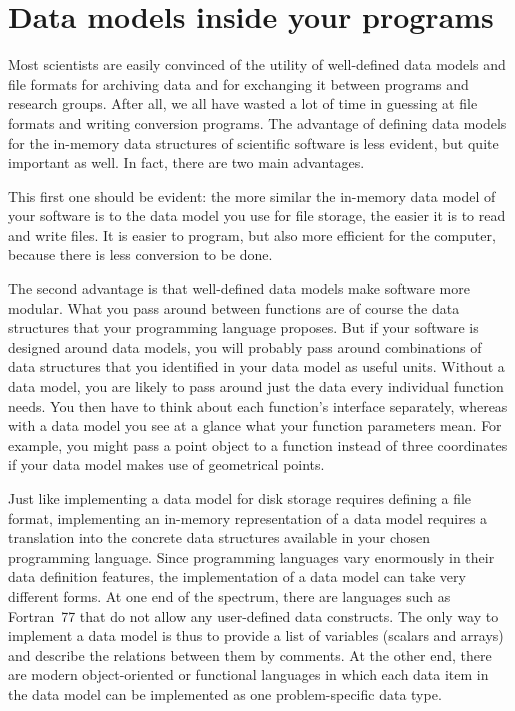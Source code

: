 \documentclass{csmagazine}
\begin{document}
\section*{Data models inside your programs}

Most scientists are easily convinced of the utility of well-defined data models and file formats for archiving data and for exchanging it between programs and research groups. After all, we all have wasted a lot of time in guessing at file formats and writing conversion programs. The advantage of defining data models for the in-memory data structures of scientific software is less evident, but quite important as well. In fact, there are two main advantages.

This first one should be evident: the more similar the in-memory data model of your software is to the data model you use for file storage, the easier it is to read and write files. It is easier to program, but also more efficient for the computer, because there is less conversion to be done.

The second advantage is that well-defined data models make software more modular. What you pass around between functions are of course the data structures that your programming language proposes. But if your software is designed around data models, you will probably pass around combinations of data structures that you identified in your data model as useful units. Without a data model, you are likely to pass around just the data every individual function needs. You then have to think about each function's interface separately, whereas with a data model you see at a glance what your function parameters mean. For example, you might pass a point object to a function instead of three coordinates if your data model makes use of geometrical points.

Just like implementing a data model for disk storage requires defining a file format, implementing an in-memory representation of a data model requires a translation into the concrete data structures available in your chosen programming language. Since programming languages vary enormously in their data definition features, the implementation of a data model can take very different forms. At one end of the spectrum, there are languages such as Fortran~77 that do not allow any user-defined data constructs. The only way to implement a data model is thus to provide a list of variables (scalars and arrays) and describe the relations between them by comments. At the other end, there are modern object-oriented or functional languages in which each data item in the data model can be implemented as one problem-specific data type.
\end{document}
